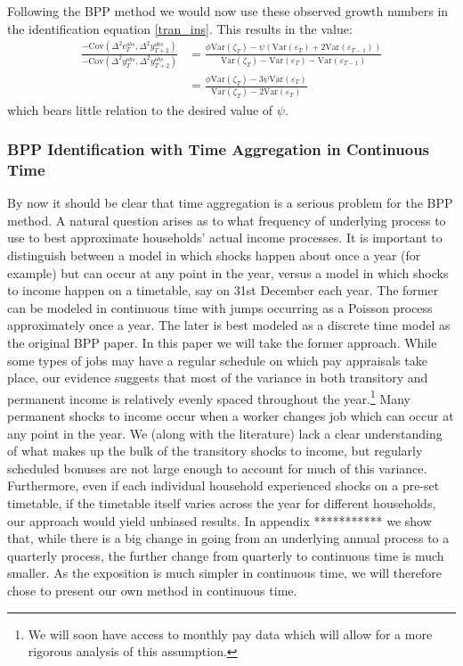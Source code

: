 \documentclass[titlepage]{\econtex}\newcommand{\texname}{IncomeUncertainty}
\begin{document}
Following the BPP method we would now use these observed growth numbers in the identification equation \ref{tran_ins}. This results in the value:
\begin{align}
\frac{-\mathrm{Cov}(\Delta^2 c^{obs}_T,\Delta^2 y^{obs}_{T+2})}{-\mathrm{Cov}(\Delta^2 y^{obs}_T,\Delta^2 y^{obs}_{T+2})} &= \frac{\phi \mathrm{Var}(\zeta_T) -\psi(\mathrm{Var}(\varepsilon_T) + 2\mathrm{Var}(\varepsilon_{T-1}) )}{ \mathrm{Var}(\zeta_T) - \mathrm{Var}(\varepsilon_T) -\mathrm{Var}(\varepsilon_{T-1}) } \nonumber\\
& = \frac{\phi \mathrm{Var}(\zeta_T) -3\psi \mathrm{Var}(\varepsilon_T)  }{ \mathrm{Var}(\zeta_T) - 2\mathrm{Var}(\varepsilon_T)  }	\label{psihat}
\end{align}
which bears little relation to the desired value of $\psi$.

\subsubsection{BPP Identification with Time Aggregation in Continuous Time} \label{BPP_cont}
By now it should be clear that time aggregation is a serious problem for the BPP method. A natural question arises as to what frequency of underlying process to use to best approximate households' actual income processes. It is important to distinguish between a model in which shocks happen about once a year (for example) but can occur at any point in the year, versus a model in which shocks to income happen on a timetable, say on 31st December each year. The former can be modeled in continuous time with jumps occurring as a Poisson process approximately once a year. The later is best modeled as a discrete time model as the original BPP paper. In this paper we will take the former approach. While some types of jobs may have a regular schedule on which pay appraisals take place, our evidence suggests that most of the variance in both transitory and permanent income is relatively evenly spaced throughout the year.\footnote{We will soon have access to monthly pay data which will allow for a more rigorous analysis of this assumption.} Many permanent shocks to income occur when a worker changes job which can occur at any point in the year. We (along with the literature) lack a clear understanding of what makes up the bulk of the transitory shocks to income, but regularly scheduled bonuses are not large enough to account for much of this variance. Furthermore, even if each individual household experienced shocks on a pre-set timetable, if the timetable itself varies across the year for different households, our approach would yield unbiased results. In appendix *********** we show that, while there is a big change in going from an underlying annual process to a quarterly process, the further change from quarterly to continuous time is much smaller. As the exposition is much simpler in continuous time, we will therefore chose to present our own method in continuous time.
\end{document}

